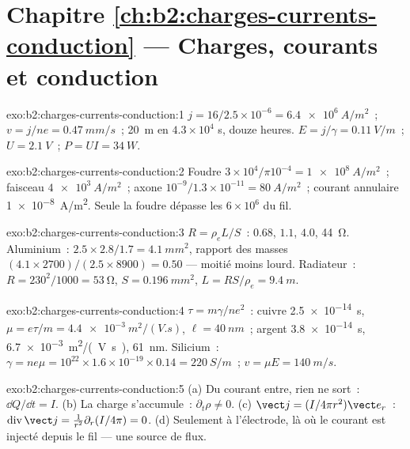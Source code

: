 \section*{Chapitre \ref{ch:b2:charges-currents-conduction} --- Charges, courants et conduction}

\begin{solution}{exo:b2:charges-currents-conduction:1}
$j = 16/2.5 \times 10^{-6} = \qty{6.4e6}{A/m^2}$~; $v = j/ne = \qty{0.47}{mm/s}$~; \qty{20}{m}
en $4.3 \times 10^4$ s, douze heures. $E = j/\gamma = \qty{0.11}{V/m}$~; $U = \qty{2.1}{V}$~;
$P = UI = \qty{34}{W}$.
\end{solution}

\begin{solution}{exo:b2:charges-currents-conduction:2}
Foudre $3 \times 10^4/\pi10^{-4} = \qty{1e8}{A/m^2}$~; faisceau $\qty{4e3}{A/m^2}$~; axone
$10^{-9}/1.3 \times 10^{-11} = \qty{80}{A/m^2}$~; courant annulaire \qty{1e-8}{A/m^2}. Seule la
foudre dépasse les $6 \times 10^6$ du fil.
\end{solution}

\begin{solution}{exo:b2:charges-currents-conduction:3}
$R = \rho_eL/S$~: $0.68$, $1.1$, $4.0$, \qty{44}{\ohm}. Aluminium~: $2.5 \times 2.8/1.7 =
\qty{4.1}{mm^2}$, rapport des masses $(4.1 \times 2700)/(2.5 \times 8900) = 0.50$ --- moitié moins lourd.
Radiateur~: $R = 230^2/1000 = \qty{53}{\ohm}$, $S = \qty{0.196}{mm^2}$, $L = RS/\rho_e = \qty{9.4}{m}$.
\end{solution}

\begin{solution}{exo:b2:charges-currents-conduction:4}
$\tau = m\gamma/ne^2$~: cuivre \qty{2.5e-14}{s}, $\mu = e\tau/m = \qty{4.4e-3}{m^2/(V.s)}$,
$\ell = \qty{40}{nm}$~; argent \qty{3.8e-14}{s}, \qty{6.7e-3}{m^2/(V.s)}, \qty{61}{nm}.
Silicium~: $\gamma = ne\mu = 10^{22} \times 1.6 \times 10^{-19} \times 0.14 = \qty{220}{S/m}$~; $v =
\mu E = \qty{140}{m/s}$.
\end{solution}

\begin{solution}{exo:b2:charges-currents-conduction:5}
(a) Du courant entre, rien ne sort~: $\dd Q/\dd t = I$. (b) La charge s'accumule~: $\partial_t
\rho \ne 0$. (c) $\vect j = (I/4\pi r^2)\vect e_r$~: $\operatorname{div}\vect j = \frac1{r^2}
\partial_r(I/4\pi) = 0$. (d) Seulement à l'électrode, là où le courant est
injecté depuis le fil --- une source de flux.
\end{solution}

